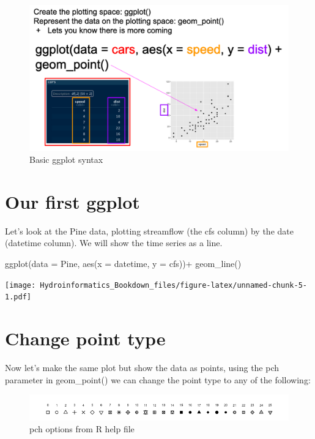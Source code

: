 \documentclass[
]{book}
\newenvironment{Shaded}{\begin{snugshade}}{\end{snugshade}}
\newcommand{\AttributeTok}[1]{\textcolor[rgb]{0.77,0.63,0.00}{#1}}
\newcommand{\FunctionTok}[1]{\textcolor[rgb]{0.00,0.00,0.00}{#1}}
\newcommand{\NormalTok}[1]{#1}
\newcommand{\SpecialCharTok}[1]{\textcolor[rgb]{0.00,0.00,0.00}{#1}}
\begin{document}
\begin{figure}
\centering
\includegraphics{images/GGplot syntax.png}
\caption{Basic ggplot syntax}
\end{figure}

\hypertarget{our-first-ggplot}{%
\section{Our first ggplot}\label{our-first-ggplot}}

Let's look at the Pine data, plotting streamflow (the cfs column) by the date (datetime column). We will show the time series as a line.

\begin{Shaded}
\begin{Highlighting}[]
\FunctionTok{ggplot}\NormalTok{(}\AttributeTok{data =}\NormalTok{ Pine, }\FunctionTok{aes}\NormalTok{(}\AttributeTok{x =}\NormalTok{ datetime, }\AttributeTok{y =}\NormalTok{ cfs))}\SpecialCharTok{+}
  \FunctionTok{geom\_line}\NormalTok{()}
\end{Highlighting}
\end{Shaded}

\texttt{[image: Hydroinformatics\_Bookdown\_files/figure-latex/unnamed-chunk-5-1.pdf]}

\hypertarget{change-point-type}{%
\section{Change point type}\label{change-point-type}}

Now let's make the same plot but show the data as points, using the pch parameter in geom\_point() we can change the point type to any of the following:

\begin{figure}
\centering
\includegraphics{images/pch.png}
\caption{pch options from R help file}
\end{figure}
\end{document}
